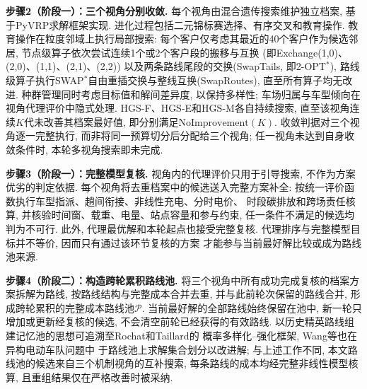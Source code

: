 \documentclass{setp-new}
\begin{document}
\textbf{步骤2（阶段一）：三个视角分别收敛.}
每个视角由混合遗传搜索\cite{ref:76}维护独立档案,
基于PyVRP求解框架\cite{ref:64}实现.
进化过程包括二元锦标赛选择、有序交叉和教育操作.
教育操作在粒度邻域上执行局部搜索: 每个客户仅考虑其最近的40个客户作为候选邻居,
节点级算子依次尝试连续1个或2个客户段的搬移与互换
(即Exchange(1,0)、(2,0)、(1,1)、(2,1)、(2,2))
以及两条路线尾段的交换(SwapTails, 即2-OPT$^*$),
路线级算子执行SWAP$^*$自由重插交换与整线互换(SwapRoutes),
直至所有算子均无改进.
种群管理同时考虑目标值和解间差异度, 以保持多样性\cite{ref:77};
车场归属与车型倾向在视角代理评价中隐式处理\cite{ref:78}.
HGS-F、HGS-E和HGS-M各自持续搜索, 直至该视角连续$K$代未改善其档案最好值,
即分别满足$\mathrm{NoImprovement}(K)$.
收敛判据对三个视角逐一完整执行, 而非将同一预算切分后分配给三个视角;
任一视角未达到自身收敛条件时, 本轮多视角搜索即未完成.

\textbf{步骤3（阶段一）：完整模型复核.}
视角内的代理评价只用于引导搜索, 不作为方案优劣的判定依据.
每个视角将去重档案中的候选送入完整方案补全:
按统一评价函数执行车型指派、趟间衔接、非线性充电、分时电价、
时段碳排放和跨场责任核算, 并核验时间窗、载重、电量、站点容量和参与约束,
任一条件不满足的候选均判为不可行.
此外, 代理最优解和本轮起点也接受完整复核.
代理排序与完整模型目标并不等价, 因而只有通过该环节复核的方案
才能参与当前最好解比较或成为路线池来源.

\textbf{步骤4（阶段二）：构造跨轮累积路线池.}
将三个视角中所有成功完成复核的档案方案拆解为路线, 按路线结构与完整成本合并去重,
并与此前轮次保留的路线合并, 形成跨轮累积的完整成本路线池$\mathcal P$.
当前最好解的全部路线始终保留在池中, 新一轮只增加或更新经复核的候选,
不会清空前轮已经获得的有效路线.
以历史精英路线组建记忆池的思想可追溯至Rochat和Taillard\cite{ref:79}的
概率多样化--强化框架, Wang等\cite{ref:80}也在异构电动车队问题中
于路线池上求解集合划分以改进解; 与上述工作不同,
本文路线池的候选来自三个机制视角的互补搜索,
每条路线的成本均经完整非线性模型核算,
且重组结果仅在严格改善时被采纳.
\end{document}
